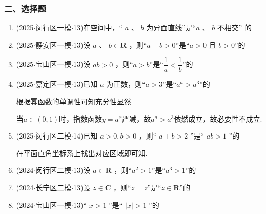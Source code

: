 \subsubsection*{二、选择题}
\begin{enumerate}
    \item (2025$\cdot$闵行区一模$\cdot$13)在空间中，“ $a$ 、 $b$ 为异面直线”是“$a$ 、 $b$ 不相交” 的 
    \item (2025$\cdot$静安区一模$\cdot$13)设 $a$ 、 $b \in  \mathbf{R}$ ，则“$a + b > 0$”是“$a > 0$ 且 $b > 0$”的 

    \item (2025$\cdot$宝山区一模$\cdot$13)设 ${ab} > 0$ ，则“$a > b$”是“$\dfrac{1}{a} < \dfrac{1}{b}$”的 

    \item (2025$\cdot$嘉定区一模$\cdot$13)已知 $a$ 为正数，则“$a > 3$”是“${a}^{a} > {a}^{3}$”的 
    \begin{jieda}
        根据幂函数的单调性可知充分性显然
        
        当$a \in (0, 1)$时，指数函数$y = a^x$严减，故$a^a > a^3$依然成立，故必要性不成立.
    \end{jieda}

    \item (2025$\cdot$闵行区二模$\cdot$14)已知 $a > 0,b > 0$ ，则“ $a + b > 2$ ”是“ ${ab} > 1$ ”的 
    \begin{jieda}
        在平面直角坐标系上找出对应区域即可知.
    \end{jieda}

    \item (2024$\cdot$闵行区二模$\cdot$13)设 $a \in  \mathbf{R}$ ，则“${a}^{2} > 1$”是“${a}^{3} > 1$”的 

    \item (2024$\cdot$长宁区二模$\cdot$13)设 $z \in  \mathbf{C}$ ，则“$z = \overline{z}$”是“$z \in  \mathbf{R}$”的 

    \item (2024$\cdot$宝山区一模$\cdot$13)“ $x > 1$ ”是“ $\left| x\right|  > 1$ ”的 


\end{enumerate}

